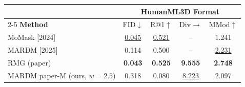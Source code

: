 \begin{tabular}{l|cccc}
\hline\hline
 & \multicolumn{4}{c}{\textbf{HumanML3D Format}} \\
\cline{2-5}
\textbf{Method} & FID$\downarrow$ & R@1$\uparrow$ & Div$\rightarrow$ & MMod$\uparrow$ \\
\hline
MoMask [2024] & \underline{0.045} & \underline{0.521} & -- & 1.241 \\
MARDM [2025] & 0.114 & 0.500 & -- & \underline{2.231} \\
RMG (paper) & \textbf{0.043} & \textbf{0.525} & \textbf{9.555} & \textbf{2.748} \\
\hline
MARDM paper-M (ours, $w=2.5$) & 0.318 & 0.080 & \underline{8.223} & 2.097 \\
\hline\hline
\end{tabular}
